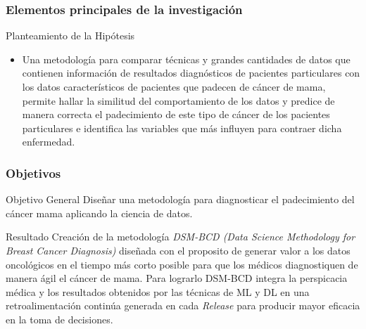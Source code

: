 \documentclass[xcolor=dvipsnames,xcolor=table,10pt]{beamer} %
\begin{document}
\begin{frame}
	\frametitle{Elementos principales de la investigación}
	\begin{block}{Planteamiento de la Hipótesis} \justifying
	\begin{itemize}
		\item Una metodología para comparar técnicas y grandes cantidades de datos que contienen información de resultados diagnósticos de pacientes particulares con los datos característicos de pacientes que padecen de cáncer de mama, permite hallar la similitud del comportamiento de los datos y predice de manera correcta el padecimiento de este tipo de cáncer de los pacientes particulares e identifica las variables que más influyen para contraer dicha enfermedad. 
	\end{itemize}

	\end{block}
\end{frame}
\begin{frame}
	\frametitle{Objetivos}
	\begin{block}{Objetivo General}
		\justifying		
		Diseñar una metodología para diagnosticar el padecimiento del cáncer mama aplicando la ciencia de datos. 
	\end{block}
	
	\begin{exampleblock}{Resultado}
	\justifying	
	Creación de la metodología \textit{DSM-BCD (Data Science Methodology for Breast Cancer Diagnosis)} diseñada con el proposito de generar valor a los datos oncológicos en el tiempo más corto posible para que los médicos diagnostiquen de manera ágil el cáncer de mama. Para lograrlo DSM-BCD integra la perspicacia médica y los resultados obtenidos por las técnicas de ML y DL en una retroalimentación continúa generada en cada \textit{Release} para producir mayor eficacia en la toma de decisiones.
	\end{exampleblock}

\end{frame}
\end{document}

